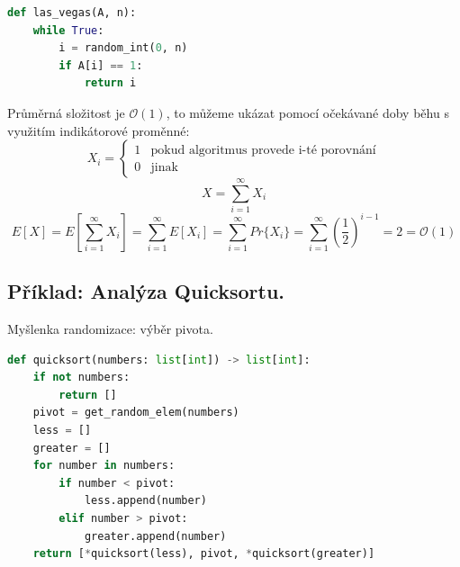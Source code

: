 \bigskip\noindent\begin{minipage}{\linewidth}
    \begin{lstlisting}[language=Python, caption={Las Vegas algoritmus v Pythonu.}]
def las_vegas(A, n):
    while True:
        i = random_int(0, n)
        if A[i] == 1:
            return i
\end{lstlisting}
\end{minipage}

\begin{compactitem}
    \item Průměrná složitost je $\mathcal{O}(1)$, to můžeme ukázat pomocí očekávané doby běhu s využitím indikátorové proměnné:
    $$ X_i = \left\{
        \begin{array}{ll}
            1 & \text{pokud algoritmus provede i-té porovnání} \\
            0 & \text{jinak}
        \end{array}
        \right. $$
    $$ X = \sum_{i=1}^{\infty} X_i $$
    $$ E[X] = E \left[ \sum_{i=1}^{\infty} X_i \right] = \sum_{i=1}^{\infty} E \left[ X_i \right] = \sum_{i=1}^{\infty} Pr\{ X_i \} =\sum_{i=1}^{\infty} \left(\frac{1}{2}\right)^{i-1} = 2 = \mathcal{O}(1)$$
\end{compactitem}

\subsection{Příklad: Analýza Quicksortu.}

\begin{compactitem}
    \item Myšlenka randomizace: výběr pivota.
\end{compactitem}

\noindent\begin{minipage}{\linewidth}
    \begin{lstlisting}[language=Python, caption={Quicksort v Pythonu.}]
def quicksort(numbers: list[int]) -> list[int]:
    if not numbers:
        return []
    pivot = get_random_elem(numbers)
    less = []
    greater = []
    for number in numbers:
        if number < pivot:
            less.append(number)
        elif number > pivot:
            greater.append(number)
    return [*quicksort(less), pivot, *quicksort(greater)]
\end{lstlisting}
\end{minipage}


